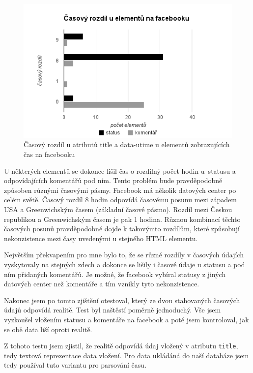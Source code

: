 \documentclass[thesis=M,czech]{FITthesis}[2013/05/10]
\begin{document}
\begin{figure}[h]
\begin{center}
\includegraphics[width=5in]{figures/timeDifference.png}
\caption{Časový rozdíl u atributů title a data-utime u elementů zobrazujících čas na facebooku}
\label{fig:timeDifference}
\end{center}
\end{figure}

U některých elementů se dokonce lišil čas o rozdílný počet hodin u~statusu a odpovídajících komentářů pod ním. Tento problém bude pravděpodobně způsoben různými časovými pásmy. Facebook má několik datových center po  celém světě. Časový rozdíl 8 hodin odpovídá časovému posunu mezi západem USA a Greenwichským časem (základní časové pásmo). Rozdíl mezi Českou republikou a Greenwichským časem je pak 1 hodina. Různou kombinací těchto časových posunů pravděpodobně dojde k takovýmto rozdílům, které způsobují nekonzistence mezi časy uvedenými u stejného HTML elementu. 

Největším překvapením pro mne bylo to, že se různé rozdíly v časových údajích vyskytovaly na stejných zdech a dokonce se lišily i časové údaje u statusu a pod ním přidaných komentářů.  Je možné, že facebook vybíral statusy z jiných datových center než komentáře a tím vznikly tyto nekonzistence.

Nakonec jsem po tomto zjištění otestoval, který ze dvou stahovaných časových údajů odpovídá realitě. Test byl naštěstí poměrně jednoduchý. Vše jsem vyzkoušel vložením statusu a komentáře na facebook a poté jsem kontroloval, jak se obě data liší oproti realitě. 

Z tohoto testu jsem zjistil, že realitě odpovídá údaj vložený v atributu \verb|title|, tedy textová reprezentace data vložení. Pro data ukládáná do naší databáze jsem tedy používal tuto variantu pro parsování času.
\end{document}
